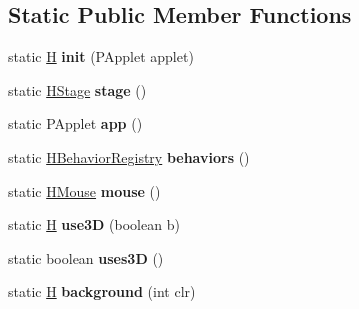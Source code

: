 \subsection*{Static Public Member Functions}
\begin{DoxyCompactItemize}
\item 
\hypertarget{classhype_1_1util_1_1_h_a715d0295b19cd87c4abd31649874e2db}{static \hyperlink{classhype_1_1util_1_1_h}{H} {\bfseries init} (P\-Applet applet)}\label{classhype_1_1util_1_1_h_a715d0295b19cd87c4abd31649874e2db}

\item 
\hypertarget{classhype_1_1util_1_1_h_a546fb07e757b926d3d35c9df84344fb3}{static \hyperlink{classhype_1_1drawable_1_1_h_stage}{H\-Stage} {\bfseries stage} ()}\label{classhype_1_1util_1_1_h_a546fb07e757b926d3d35c9df84344fb3}

\item 
\hypertarget{classhype_1_1util_1_1_h_af3feb9f401a52531f8e9863b6037bca7}{static P\-Applet {\bfseries app} ()}\label{classhype_1_1util_1_1_h_af3feb9f401a52531f8e9863b6037bca7}

\item 
\hypertarget{classhype_1_1util_1_1_h_a15be690e44f0bff8993dd56076533049}{static \hyperlink{classhype_1_1behavior_1_1_h_behavior_registry}{H\-Behavior\-Registry} {\bfseries behaviors} ()}\label{classhype_1_1util_1_1_h_a15be690e44f0bff8993dd56076533049}

\item 
\hypertarget{classhype_1_1util_1_1_h_acd583485bc081dad1348a972c1451272}{static \hyperlink{classhype_1_1event_1_1_h_mouse}{H\-Mouse} {\bfseries mouse} ()}\label{classhype_1_1util_1_1_h_acd583485bc081dad1348a972c1451272}

\item 
\hypertarget{classhype_1_1util_1_1_h_a84c17f24fb183230eb2b4c917a784011}{static \hyperlink{classhype_1_1util_1_1_h}{H} {\bfseries use3\-D} (boolean b)}\label{classhype_1_1util_1_1_h_a84c17f24fb183230eb2b4c917a784011}

\item 
\hypertarget{classhype_1_1util_1_1_h_a4634e5ad3a2c9c617c7a82d5bbb90d68}{static boolean {\bfseries uses3\-D} ()}\label{classhype_1_1util_1_1_h_a4634e5ad3a2c9c617c7a82d5bbb90d68}

\item 
\hypertarget{classhype_1_1util_1_1_h_a0470663ee53fc2608a63b1c2467d1e9a}{static \hyperlink{classhype_1_1util_1_1_h}{H} {\bfseries background} (int clr)}\label{classhype_1_1util_1_1_h_a0470663ee53fc2608a63b1c2467d1e9a}


\end{DoxyCompactItemize}

